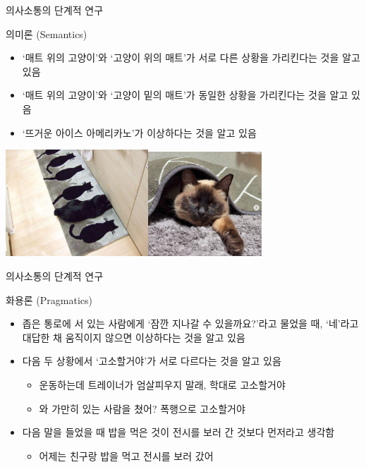 \documentclass[11pt, aspectratio=169]{beamer}
\begin{document}
\begin{frame}[t]{의사소통의 단계적 연구}
  \begin{block}{의미론 (Semantics)}
    \begin{itemize}
      \item ‘매트 위의 고양이’와 ‘고양이 위의 매트’가 서로 다른 상황을 가리킨다는 것을 알고 있음
      \item ‘매트 위의 고양이’와 ‘고양이 밑의 매트’가 동일한 상황을 가리킨다는 것을 알고 있음
      \item ‘뜨거운 아이스 아메리카노’가 이상하다는 것을 알고 있음
    \end{itemize}
  \end{block}
  \begin{center}
    \includegraphics[width=0.4\textwidth]{img/fgvg8a60r5056otfhc05.jpg}\includegraphics[width=0.32\textwidth]{img/mat_on_the_cat.png}
  \end{center}
\end{frame}

\begin{frame}[t]{의사소통의 단계적 연구}
  \begin{block}{화용론 (Pragmatics)}
    \begin{itemize}
      \item 좁은 통로에 서 있는 사람에게 ‘잠깐 지나갈 수 있을까요?’라고 물었을 때, ‘네’라고 대답한 채 움직이지 않으면 이상하다는 것을 알고 있음
      \item 다음 두 상황에서 ‘고소할거야’가 서로 다르다는 것을 알고 있음
        \begin{itemize}
          \item 운동하는데 트레이너가 엄살피우지 말래, 학대로 고소할거야
          \item 와 가만히 있는 사람을 쳤어? 폭행으로 고소할거야
        \end{itemize}
      \item 다음 말을 들었을 때 밥을 먹은 것이 전시를 보러 간 것보다 먼저라고 생각함
        \begin{itemize}
          \item 어제는 친구랑 밥을 먹고 전시를 보러 갔어
        \end{itemize}
    \end{itemize}    
  \end{block}  
\end{frame}
\end{document}
